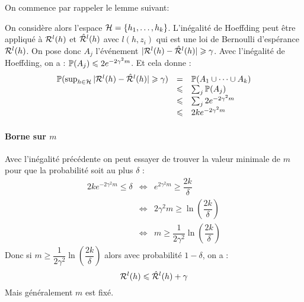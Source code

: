 
On commence par rappeler le lemme suivant: \vspace{3mm}
\vspace{2mm}

On considère alors l'espace $\mathcal{H} = \{ h_1, \dots, h_k \}$. L'inégalité de Hoeffding peut être appliqué à $\mathcal{R}^l(h)$ et $\hat{\mathcal{R}}^l(h)$ avec $l(h, z_i)$ qui est une loi de Bernoulli d'espérance $\mathcal{R}^l(h)$. On pose donc $A_j$ l'événement $| \mathcal{R}^l(h) - \hat{\mathcal{R}}^l(h) | \geqslant \gamma$. Avec l'inégalité de Hoeffding, on a : $\mathbb{P}(A_j) \leqslant 2 e^{-2 \gamma^2 m}$. Et cela donne :
$$ \begin{array}{lll}
	\mathbb{P}(\sup_{h \in \mathcal{H}} | \mathcal{R}^l(h) - \hat{\mathcal{R}}^l(h) | \geqslant \gamma )
	 & = & \mathbb{P}(A_1 \cup \dots \cup A_k) \\
	 & \leqslant & \sum_j \mathbb{P}(A_j) \\
	 & \leqslant & \sum_j 2 e^{-2 \gamma^2 m} \\
	 & \leqslant & 2k e^{-2 \gamma^2 m}
\end{array} $$

\paragraph{Borne sur $m$}
Avec l'inégalité précédente on peut essayer de trouver la valeur minimale de $m$ pour que la probabilité soit au plus $\delta$ :
$$ \begin{array}{lll}
	2k e^{-2 \gamma^2 m} \leqslant \delta
	 & \Leftrightarrow & e^{2 \gamma^2 m} \geqslant \dfrac{2k}{\delta} \\
	 & \Leftrightarrow & 2 \gamma^2 m \geqslant \ln \left( \dfrac{2k}{\delta} \right) \\
	 & \Leftrightarrow & m \geqslant \dfrac{1}{2 \gamma^2} \ln \left( \dfrac{2k}{\delta} \right)
\end{array} $$
Donc si $m \geqslant \dfrac{1}{2 \gamma^2} \ln \left( \dfrac{2k}{\delta} \right)$ alors avec probabilité $1 - \delta$, on a :
$$ \mathcal{R}^l(h) \leqslant \hat{\mathcal{R}}^l(h) + \gamma $$
Mais généralement $m$ est fixé.

